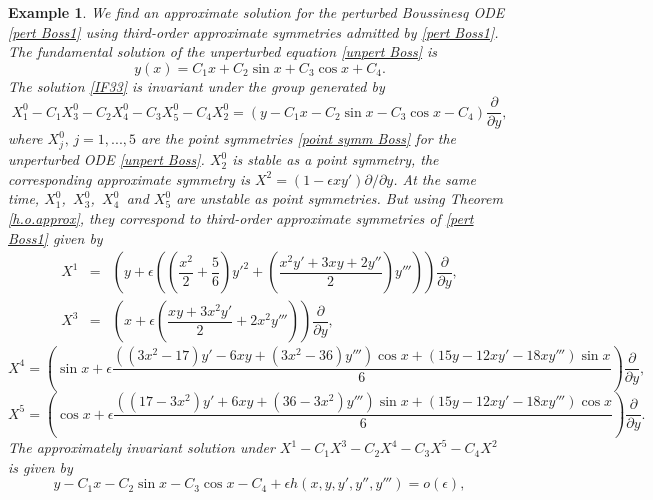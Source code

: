 \documentclass[11pt,letter,subeqn]{article}
\newtheorem{example}{Example}[section]
\begin{document}
   \begin{example}
   We find an approximate solution for the perturbed Boussinesq ODE \eqref{pert Boss1} using third-order approximate symmetries admitted by \eqref{pert Boss1}. The fundamental solution of the  unperturbed equation \eqref{unpert Boss} is
     \begin{equation}\label{IF33}
         y(x)=C_1x+C_2 \sin x+C_3 \cos x+C_4.
     \end{equation}
     The solution \eqref{IF33} is invariant under the group generated by
     \begin{equation}\label{IF34}
       X_1^0-C_1 X_3^0 - C_2 X_4^0 -C_3 X_5^0-C_4 X_2^0 =\left(y-C_1x-C_2 \sin x-C_3 \cos x-C_4\right)\dfrac{\partial}{\partial y},
     \end{equation}
     where $ X_j^0,\,j=1,...,5$ are the point symmetries \eqref{point symm Boss} for the unperturbed ODE \eqref{unpert Boss}. $X_2^0$ is {\textrm{stable}} as a point symmetry, the corresponding approximate symmetry is  $X^2=(1-\epsilon xy')\partial/\partial y$. At the same time, $X_1^0$,\, $X_3^0$,\, $X_4^0$\, and $X_5^0$ are {\textrm{unstable}} as point symmetries. But using Theorem \ref{h.o.approx}, they correspond to third-order approximate symmetries of \eqref{pert Boss1} given by
     \begin{eqnarray}
       X^1 &=& \left(y+\epsilon\left(\left(\dfrac{x^2}{2}+\dfrac{5}{6}\right){y'}^2+\left(\dfrac{x^2y'+3xy+2y''}{2}\right)y'''\right)\right)\dfrac{\partial}{\partial y},  \\
       X^3 &=& \left(x+\epsilon\left(\dfrac{xy+3x^2y'}{2}+2x^2y'''\right)\right) \dfrac{\partial}{\partial y},
       \end{eqnarray}
       \begin{equation}\label{}
         X^4 = \left(\sin x+\epsilon\frac{\left((3x^2-17)y'-6xy+(3x^2-36)y'''\right)\cos x+\left(15y-12xy'-18xy'''\right)\sin x}{6}\right)\dfrac{\partial}{\partial y},
       \end{equation}
       \begin{equation}\label{}
         X^5 = \left(\cos x+\epsilon\frac{\left((17-3x^2)y'+6xy+(36-3x^2)y'''\right)\sin x+\left(15y-12xy'-18xy'''\right)\cos x}{6}\right)\dfrac{\partial}{\partial y}.
       \end{equation}
       The approximately invariant solution under $X^1-C_1X^3-C_2X^4-C_3X^5-C_4X^2$ is given by
       \begin{equation}\label{IF 34}
         y-C_1x-C_2 \sin x-C_3 \cos x-C_4+\epsilon h(x,y,y',y'',y''')=o(\epsilon),

\end{equation}
\end{example}
\end{document}
